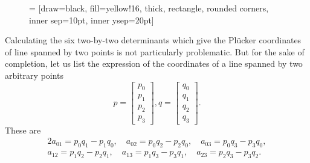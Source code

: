 \documentclass[a4paper,12pt]{book}
\theoremstyle{plain}
\theoremstyle{definition}
\begin{document}
\begin{figure}
 = [draw=black, fill=yellow!16, thick,
	rectangle, rounded corners, inner sep=10pt, inner ysep=20pt]
\end{figure}

Calculating the six two-by-two determinants which give the Pl\"ucker coordinates of
line spanned by two points is not particularly problematic. But for the sake of
completion, let us list the expression of the coordinates of a line spanned by two
arbitrary points
\[
	p = \begin{bmatrix}
		p_0 \\ p_1 \\ p_2 \\ p_3
	\end{bmatrix}, q = \begin{bmatrix}
		q_0 \\ q_1 \\ q_2 \\ q_3
	\end{bmatrix}.
\]
These are
\begin{alignat}{2}
	a_{01} = p_0 q_1 - p_1 q_0, \quad a_{02} = p_0 q_2 - p_2 q_0, \quad
	 a_{03} = p_0 q_3 - p_3 q_0, \label{lineplucker} \\
	a_{12} = p_1 q_2 - p_2 q_1, \quad a_{13} = p_1 q_3 - p_3 q_1, \quad
	 a_{23} = p_2 q_3 - p_3 q_2.
\end{alignat}
\end{document}
